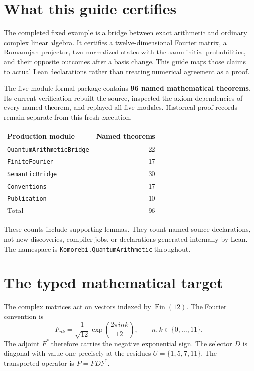 \section{What this guide certifies}
The completed fixed example is a bridge between exact arithmetic and ordinary
complex linear algebra. It certifies a twelve-dimensional Fourier matrix, a
Ramanujan projector, two normalized states with the same initial probabilities,
and their opposite outcomes after a basis change. This guide maps those claims to
actual Lean declarations rather than treating numerical agreement as a proof.

The five-module formal package contains \textbf{96 named mathematical theorems}. Its current verification rebuilt the source, inspected the axiom dependencies of every named theorem, and replayed all five modules. Historical proof records remain separate from this fresh execution.

\begin{center}
\begin{tabular}{lr}
\toprule
Production module & Named theorems\\
\midrule
\texttt{QuantumArithmeticBridge} & 22\\
\texttt{FiniteFourier} & 17\\
\texttt{SemanticBridge} & 30\\
\texttt{Conventions} & 17\\
\texttt{Publication} & 10\\
\midrule
Total & 96\\
\bottomrule
\end{tabular}
\end{center}

These counts include supporting lemmas. They count named source declarations,
not new discoveries, compiler jobs, or declarations generated internally by Lean.
The namespace is \texttt{Komorebi.QuantumArithmetic} throughout.

\section{The typed mathematical target}
The complex matrices act on vectors indexed by \(\operatorname{Fin}(12)\).
The Fourier convention is
\[
 F_{nk}=\frac{1}{\sqrt{12}}\exp\!\left(\frac{2\pi i nk}{12}\right),
 \qquad n,k\in\{0,\ldots,11\}.
\]
The adjoint \(F^*\) therefore carries the negative exponential sign. The
selector \(D\) is diagonal with value one precisely at the residues
\(U=\{1,5,7,11\}\). The transported operator is \(P=FDF^*\).

